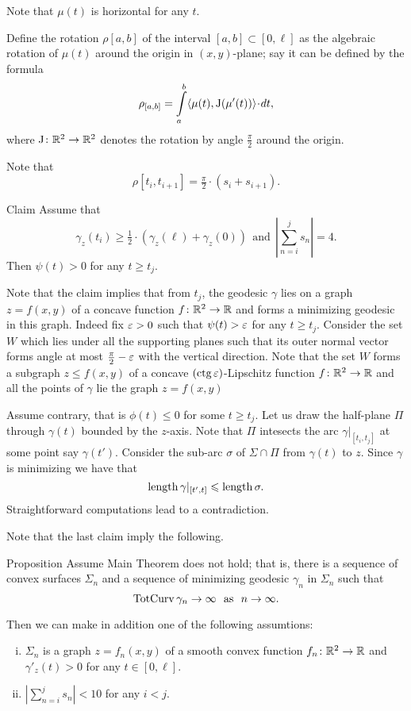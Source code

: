 \documentclass[a4paper,10pt]{amsart}
\begin{document}
Note that $\mu(t)$ is horizontal for any $t$.

Define the rotation $\rho[a,b]$  
of the interval $[a,b]\subset[0,\ell]$
as the
algebraic rotation of $\mu(t)$ around the origin in $(x,y)$-plane;
say it can be defined by the formula 
\[\rho_{[a,b]}
=
\int\limits_a^b \<\mu(t),\mathrm{J}(\mu'(t))\>\cdot dt,\]
where $\mathrm{J}\colon\mathbb{R}^2\to\mathbb{R}^2$ denotes the rotation by angle $\tfrac\pi 2$ around the origin.

Note that 
\[\rho[t_i,t_{i+1}]=\tfrac\pi2\cdot(s_i+s_{i+1}).\]

\begin{thm}{Claim}
Assume that 
\[\gamma_z(t_i)\ge \tfrac12\cdot(\gamma_z(\ell)+\gamma_z(0))\ \ \text{and}\ \ \left|\sum_{n=i}^js_n\right|=4.\]
Then $\psi(t)>0$ for any $t\ge t_j$.
\end{thm}

Note that the claim implies that from $t_j$,
the geodesic $\gamma$ 
lies on a graph $z=f(x,y)$ of a concave function $f\colon\mathbb{R}^2\to\mathbb{R}$
and forms a minimizing geodesic in this graph.
Indeed fix $\varepsilon>0$ such that $\psi(t)>\varepsilon$
for any $t\ge t_j$.
Consider the set $W$ which lies under all the supporting planes 
such that its outer normal vector forms angle at most 
$\tfrac\pi2-\varepsilon$ with the vertical direction.
Note that the set $W$ forms a subgraph $z\le f(x,y)$ 
of a  concave $(\mathop{\rm ctg} \varepsilon)$-Lipschitz function $f\colon\mathbb{R}^2\to \mathbb{R}$
and all the points of $\gamma$ lie the graph $z=f(x,y)$

Assume contrary, that is $\phi(t)\le 0$ for some $t\ge t_j$.
Let us draw the half-plane $\Pi$ through $\gamma(t)$ bounded by the $z$-axis.
Note that $\Pi$ intesects the arc $\gamma|_{[t_i,t_j]}$ at some point say 
$\gamma(t')$.
Consider the sub-arc $\sigma$ 
of $\Sigma\cap\Pi$ from $\gamma(t)$
to $z$.
Since $\gamma$ is minimizing we have that 
\[\mathop{\rm length}\nolimits \gamma|_{[t',t]}\leqslant \mathop{\rm length}\nolimits\sigma.\]
Straightforward computations lead to a contradiction.
\qeds

Note that the last claim imply the following.

\begin{thm}{Proposition}\label{prop:graph}
Assume Main Theorem does not hold;
that is, there is a sequence of convex surfaces $\Sigma_n$
and a sequence of minimizing geodesic $\gamma_n$ in $\Sigma_n$ such that 
\[\tc \gamma_n\to\infty\ \ \text{as}\ \ n\to\infty.\]

Then we can make in addition one of the following assumtions:

\begin{enumerate}[(i)]
\item\label{graph} $\Sigma_n$ is a graph $z=f_n(x,y)$ of a smooth convex function $f_n\colon\mathbb{R}^2\to\mathbb{R}$
and $\gamma'_z(t)>0$ for any $t\in[0,\ell]$. 
\item\label{finite} $\left|\sum_{n=i}^js_n\right|<10$ for any $i<j$.
\end{enumerate} 
\end{thm}
\end{document}
